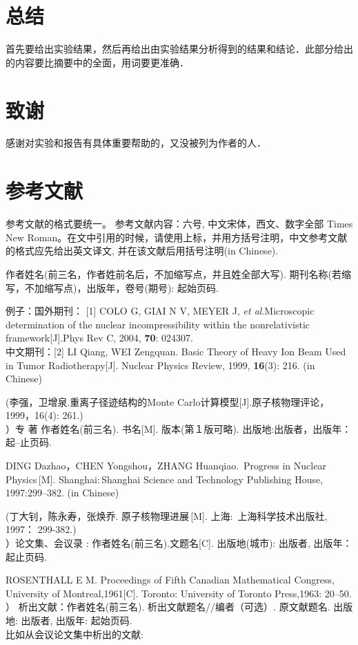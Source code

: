\documentclass[a4paper,10.0pt,twoside]{npr}
\begin{document}
\begin{multicols}{2}
\section{总结}
首先要给出实验结果，然后再给出由实验结果分析得到的结果和结论．此部分给出的内容要比摘要中的全面，用词要更准确．
\section{致谢}
 感谢对实验和报告有具体重要帮助的，又没被列为作者的人． 
\section{参考文献}
参考文献的格式要统一。
参考文献内容：六号, 中文宋体，西文、数字全部 Times New
Roman。在文中引用的时候，请使用上标，并用方括号注明，中文参考文献的格式应先给出英文译文,
并在该文献后用括号注明(in Chinese).

 \song [序号]
作者姓名(前三名，作者姓前名后，不加缩写点，并且姓全部大写).
期刊名称(若缩写，不加缩写点)，出版年，卷号(期号): 起始页码.

例子：国外期刊\cite{qikan:1996ff}： [1] COLO G, GIAI N V, MEYER
J, \emph{et al}.Microscopic determination of the nuclear incompressibility within the nonrelativistic framework[J].Phys Rev C, 2004, \textbf{70}: 024307.\\
中文期刊\cite{qikancn:2002mu}：[2] LI Qiang, WEI
Zengquan. Basic Theory of Heavy Ion Beam Used in Tumor Radiotherapy[J]. Nuclear Physics Review, 1999, \textbf{16}(3): 216. (in Chinese)

 (李强，卫增泉.重离子径迹结构的Monte Carlo计算模型[J].原子核物理评论，1999，16(4): 261.)\\
）专 著 \song [序号] 作者姓名(前三名).
书名[M]. 版本(第１版可略). 出版地:出版者，出版年：起--止页码.

\noindent
[3] DING Dazhao，CHEN Yongshou，ZHANG Huanqiao.~Progress in Nuclear Physics\,[M].
Shanghai:\,Shanghai Science and Technology Publishing
House, 1997:299--382. (in Chinese)

\noindent
(丁大钊，陈永寿，张焕乔. 原子核物理进展\,[M]. 上海:~上海科学技术出版社, 1997： 299-382.) \\
）论文集、会议录 \cite{meet:1993}: \song [序号]
 作者姓名(前三名).文题名[C]. 出版地(城市): 出版者, 出版年：起止页码.

\noindent
[4] ROSENTHALL E M. Proceedings of Fifth Canadian Mathematical Congress, University of Montreal,1961[C]. Toronto: University of Toronto Press,1963: 20--50.\\
） 析出文献\cite{meeting:2007pc}：\song [序号]
 作者姓名(前三名). 析出文献题名//编者（可选）. 原文献题名. 出版地: 出版者, 出版年: 起始页码.\\
比如从会议论文集中析出的文献:


\end{multicols}
\end{document}
